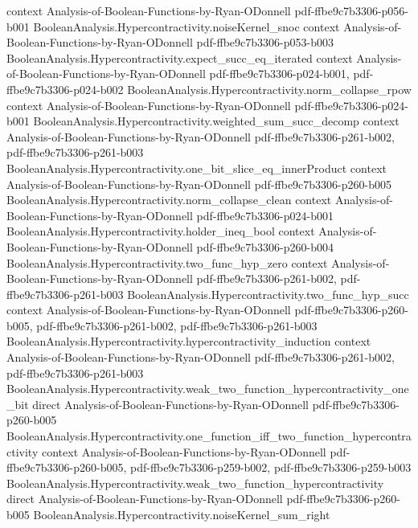 \begin{theorem}
  {context}
  {Analysis-of-Boolean-Functions-by-Ryan-ODonnell}
  {pdf-ffbe9c7b3306-p056-b001}
\proofstep
  {BooleanAnalysis.Hypercontractivity.noiseKernel_snoc}
  {context}
  {Analysis-of-Boolean-Functions-by-Ryan-ODonnell}
  {pdf-ffbe9c7b3306-p053-b003}
\proofstep
  {BooleanAnalysis.Hypercontractivity.expect_succ_eq_iterated}
  {context}
  {Analysis-of-Boolean-Functions-by-Ryan-ODonnell}
  {pdf-ffbe9c7b3306-p024-b001,
    pdf-ffbe9c7b3306-p024-b002}
\proofstep
  {BooleanAnalysis.Hypercontractivity.norm_collapse_rpow}
  {context}
  {Analysis-of-Boolean-Functions-by-Ryan-ODonnell}
  {pdf-ffbe9c7b3306-p024-b001}
\proofstep
  {BooleanAnalysis.Hypercontractivity.weighted_sum_succ_decomp}
  {context}
  {Analysis-of-Boolean-Functions-by-Ryan-ODonnell}
  {pdf-ffbe9c7b3306-p261-b002,
    pdf-ffbe9c7b3306-p261-b003}
\proofstep
  {BooleanAnalysis.Hypercontractivity.one_bit_slice_eq_innerProduct}
  {context}
  {Analysis-of-Boolean-Functions-by-Ryan-ODonnell}
  {pdf-ffbe9c7b3306-p260-b005}
\proofstep
  {BooleanAnalysis.Hypercontractivity.norm_collapse_clean}
  {context}
  {Analysis-of-Boolean-Functions-by-Ryan-ODonnell}
  {pdf-ffbe9c7b3306-p024-b001}
\proofstep
  {BooleanAnalysis.Hypercontractivity.holder_ineq_bool}
  {context}
  {Analysis-of-Boolean-Functions-by-Ryan-ODonnell}
  {pdf-ffbe9c7b3306-p260-b004}
\proofstep
  {BooleanAnalysis.Hypercontractivity.two_func_hyp_zero}
  {context}
  {Analysis-of-Boolean-Functions-by-Ryan-ODonnell}
  {pdf-ffbe9c7b3306-p261-b002,
    pdf-ffbe9c7b3306-p261-b003}
\proofstep
  {BooleanAnalysis.Hypercontractivity.two_func_hyp_succ}
  {context}
  {Analysis-of-Boolean-Functions-by-Ryan-ODonnell}
  {pdf-ffbe9c7b3306-p260-b005,
    pdf-ffbe9c7b3306-p261-b002,
    pdf-ffbe9c7b3306-p261-b003}
\proofstep
  {BooleanAnalysis.Hypercontractivity.hypercontractivity_induction}
  {context}
  {Analysis-of-Boolean-Functions-by-Ryan-ODonnell}
  {pdf-ffbe9c7b3306-p261-b002,
    pdf-ffbe9c7b3306-p261-b003}
\proofstep
  {BooleanAnalysis.Hypercontractivity.weak_two_function_hypercontractivity_one_bit}
  {direct}
  {Analysis-of-Boolean-Functions-by-Ryan-ODonnell}
  {pdf-ffbe9c7b3306-p260-b005}
\proofstep
  {BooleanAnalysis.Hypercontractivity.one_function_iff_two_function_hypercontractivity}
  {context}
  {Analysis-of-Boolean-Functions-by-Ryan-ODonnell}
  {pdf-ffbe9c7b3306-p260-b005,
    pdf-ffbe9c7b3306-p259-b002,
    pdf-ffbe9c7b3306-p259-b003}
\proofstep
  {BooleanAnalysis.Hypercontractivity.weak_two_function_hypercontractivity}
  {direct}
  {Analysis-of-Boolean-Functions-by-Ryan-ODonnell}
  {pdf-ffbe9c7b3306-p260-b005}
\proofstep
  {BooleanAnalysis.Hypercontractivity.noiseKernel_sum_right}

\end{theorem}
